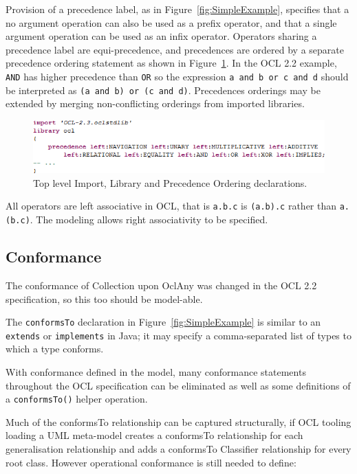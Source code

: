 \documentclass{eceasst}
\begin{document}
Provision of a precedence label, as in Figure~\ref{fig:SimpleExample}, specifies that a no argument operation can also be used as a prefix operator, and that a single argument operation can be used as an infix operator. Operators sharing a precedence label are equi-precedence, and precedences are ordered by a separate precedence ordering statement as shown in Figure~\ref{fig:Precedence}. In the OCL 2.2 example, \verb|AND| has higher precedence than \verb|OR| so the expression \verb|a and b or c and d| should be interpreted as \verb|(a and b) or (c and d)|. Precedences orderings may be extended by merging non-conflicting orderings from imported libraries.

\begin{figure}
  \begin{center}
    \includegraphics[width=5.75in]{Precedence.png}
  \end{center}
  \caption{Top level Import, Library and Precedence Ordering declarations.}
  \label{fig:Precedence}
\end{figure}

All operators are left associative in OCL, that is \verb|a.b.c| is \verb|(a.b).c| rather than \verb|a.(b.c)|. The modeling allows right associativity to be specified.

\subsection{Conformance}

The conformance of Collection upon OclAny was changed in the OCL 2.2 specification, so this too should be model-able.

The \verb|conformsTo| declaration in Figure~\ref{fig:SimpleExample} is similar to an \verb|extends| or \verb|implements| in Java; it may specify a comma-separated list of types to which a type conforms.

With conformance defined in the model, many conformance statements throughout the OCL specification can be eliminated as well as some definitions of a \verb|conformsTo()| helper operation.

Much of the conformsTo relationship can be captured structurally, if OCL tooling loading a UML meta-model creates a conformsTo relationship for each generalisation relationship and adds a conformsTo Classifier relationship for every root class. However operational conformance is still needed to define:
\end{document}
